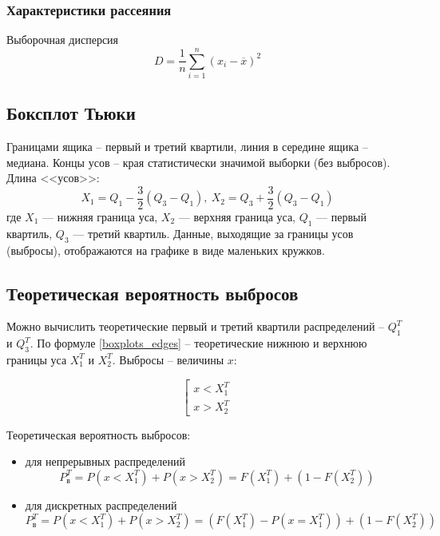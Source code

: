 \documentclass[12pt]{article}
\begin{document}
	\subsubsection{Характеристики рассеяния}
	
	Выборочная дисперсия 
	\begin{equation}
		D = \dfrac{1}{n}\sum\limits_{i=1}^n(x_i-\overline{x})^2
	\end{equation}
	
	\subsection{Боксплот Тьюки}
	
	Границами ящика – первый и третий квартили, линия в середине ящика -- медиана. Концы усов -- края статистически значимой выборки (без выбросов). Длина <<усов>>:
	\begin{equation} \label{boxplots_edges}
		X_1 = Q_1 - \dfrac{3}{2}(Q_3-Q_1),\ X_2 = Q_3 + \dfrac{3}{2}(Q_3-Q_1)
	\end{equation}
	где $X_1$ — нижняя граница уса, $X_2$ — верхняя граница уса, $Q_1$ — первый квартиль, $Q_3$ — третий квартиль. Данные, выходящие за границы усов (выбросы), отображаются на графике в виде маленьких кружков.
	
	\subsection{Теоретическая вероятность выбросов}
	
	Можно вычислить теоретические первый и третий квартили распределений -- $Q_1^T$ и $Q_3^T$. По формуле \eqref{boxplots_edges} – теоретические нижнюю и верхнюю границы уса $X_1^T$ и $X_2^T$. Выбросы -- величины $x$:
	
	\begin{equation}
		\left[
		\begin{gathered}
			x < X_1^T\\
			x > X_2^T
		\end{gathered}\right.
	\end{equation}

	Теоретическая вероятность выбросов:
	\begin{itemize}
		\item для непрерывных распределений
		\begin{equation}
			P_{\text{в}}^T = P(x < X_1^T) + P(x > X_2^T) = F(X_1^T) + \left(1-F(X_2^T)\right)
		\end{equation}
		\item для дискретных распределений
		\begin{equation}
			P_{\text{в}}^T = P(x < X_1^T) + P(x > X_2^T) = \left(F(X_1^T) - P(x = X_1^T)\right) + \left(1-F(X_2^T)\right)
		\end{equation}
	\end{itemize}
	
\end{document}

